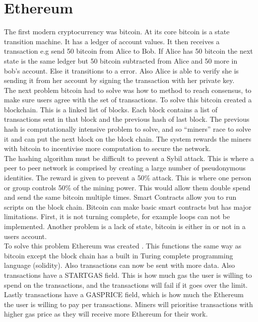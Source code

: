 \section{Ethereum}
The first modern cryptocurrency was bitcoin. At its core bitcoin is a state transition machine. It has a ledger of account values. It then receives a transaction e.g send 50 bitcoin from Alice to Bob. If Alice has 50 bitcoin the next state is the same ledger but 50 bitcoin subtracted from Alice and 50 more in bob’s account. Else it transitions to a error. Also Alice is able to verify she is sending it from her account by signing the transaction with her private key. \\
The next problem bitcoin had to solve was how to method to reach consensus, to make sure users agree with the set of transactions. To solve this bitcoin created a blockchain. This is a linked list of blocks. Each block contains a list of transactions sent in that block and the previous hash of last block. The previous hash is computationally intensive problem to solve, and so “miners” race to solve it and can put the next block on the block chain. The system rewards the miners with bitcoin to incentivise more computation to secure the network. \\
The hashing algorithm must be difficult to prevent a Sybil attack. This is where a peer to peer network is comprised by creating a large number of pseudonymous identities. The reward is given to prevent a 50\% attack. This is where one person or group controls 50\% of the mining power. This would allow them double spend and send the same bitcoin multiple times.
Smart Contracts allow you to run scripts on the block chain. Bitcoin can make basic smart contracts but has major limitations. First, it is not turning complete, for example loops can not be implemented. Another problem is a lack of state, bitcoin is either in or not in a users account. \\
To solve this problem Ethereum was created \citep{EthereumWhitePaper:2018:pdflatex}. This functions the same way as bitcoin except the block chain has a built in Turing complete programming language (solidity). Also transactions can now be sent with more data. Also transactions have a STARTGAS field. This is how much gas the user is willing to spend on the transactions, and the transactions will fail if it goes over the limit. Lastly transactions have a GASPRICE field, which is how much the Ethereum the user is willing to pay per transactions. Miners will prioritise transactions with higher gas price as they will receive more Ethereum for their work.  
